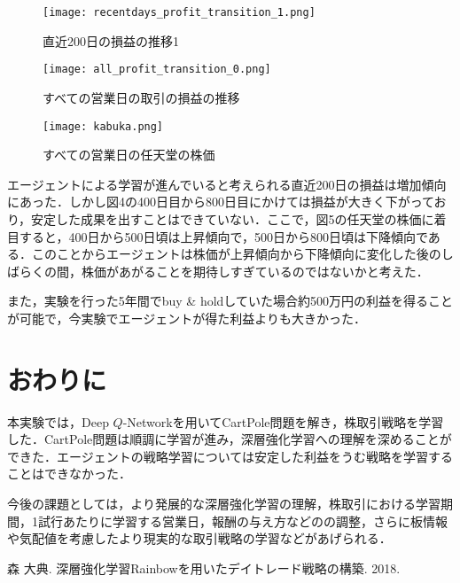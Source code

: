 \documentclass[twocolumn]{jarticle}
\begin{document}
        \begin{figure}
            \texttt{[image: recentdays\_profit\_transition\_1.png]}
            \caption{直近200日の損益の推移1}
        \end{figure}

        \begin{figure}
            \texttt{[image: all\_profit\_transition\_0.png]}
            \caption{すべての営業日の取引の損益の推移}
        \end{figure}

        \begin{figure}
            \texttt{[image: kabuka.png]}
            \caption{すべての営業日の任天堂の株価}
        \end{figure}

        エージェントによる学習が進んでいると考えられる直近200日の損益は増加傾向にあった．しかし図4の400日目から800日目にかけては損益が大きく下がっており，安定した成果を出すことはできていない．ここで，図5の任天堂の株価に着目すると，400日から500日頃は上昇傾向で，500日から800日頃は下降傾向である．このことからエージェントは株価が上昇傾向から下降傾向に変化した後のしばらくの間，株価があがることを期待しすぎているのではないかと考えた．

        また，実験を行った5年間でbuy \& holdしていた場合約500万円の利益を得ることが可能で，今実験でエージェントが得た利益よりも大きかった．
        
\section{おわりに}
本実験では，Deep $Q$-Networkを用いてCartPole問題を解き，株取引戦略を学習した．CartPole問題は順調に学習が進み，深層強化学習への理解を深めることができた．エージェントの戦略学習については安定した利益をうむ戦略を学習することはできなかった．

今後の課題としては，より発展的な深層強化学習の理解，株取引における学習期間，1試行あたりに学習する営業日，報酬の与え方などのの調整，さらに板情報や気配値を考慮したより現実的な取引戦略の学習などがあげられる．

\begin{thebibliography}{9}
     森 大典. 深層強化学習Rainbowを用いたデイトレード戦略の構築. 2018.
\end{thebibliography}
\end{document}
